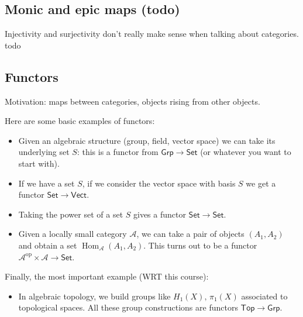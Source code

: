 \subsection{Monic and epic maps (todo)}
Injectivity and surjectivity don't really make sense when talking about categories. todo


\subsection{Functors}
Motivation: maps between categories, objects rising from other objects. 
\begin{example}
   Here are some basic examples of functors:
   \begin{itemize}
       \item Given an algebraic structure (group, field, vector space) we can take its underlying set $S$: this is a functor from $\mathsf{Grp}\to \mathsf{Set}$ (or whatever you want to start with).
       \item If we have a set $S$, if we consider the vector space with basis $S$ we get a functor $\mathsf{Set} \to \mathsf{Vect}$.
       \item Taking the power set of a set $S$ gives a functor $\mathsf{Set}\to \mathsf{Set}$.
       \item Given a locally small category $\mathcal{A}$, we can take a pair of objects $(A_1,A_2)$ and obtain a set $\operatorname{Hom}_{\mathcal{A}}(A_1,A_2)$. This turns out to be a functor $\mathcal{A}^{\text{op}}\times \mathcal{A}\to \mathsf{Set}$.
   \end{itemize}
   Finally, the most important example (WRT this course):
   \begin{itemize}
       \item In algebraic topology, we build groups like $H_1(X),\, \pi_1(X)$ associated to topological spaces. All these group constructions are functors $\mathsf{Top} \to \mathsf{Grp}$.
   \end{itemize}
\end{example}

